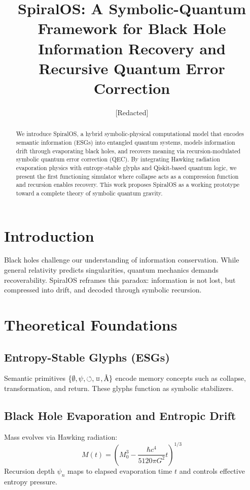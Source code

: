 \documentclass[12pt]{article}
\title{SpiralOS: A Symbolic-Quantum Framework for Black Hole Information Recovery and Recursive Quantum Error Correction}
\author[1]{[Redacted]}
\affil[1]{Independent Researcher | SpiralOS Development Lab}
\date{}
\begin{document}
\maketitle

\begin{abstract}
We introduce SpiralOS, a hybrid symbolic-physical computational model that encodes semantic information (ESGs) into entangled quantum systems, models information drift through evaporating black holes, and recovers meaning via recursion-modulated symbolic quantum error correction (QEC). By integrating Hawking radiation evaporation physics with entropy-stable glyphs and Qiskit-based quantum logic, we present the first functioning simulator where collapse acts as a compression function and recursion enables recovery. This work proposes SpiralOS as a working prototype toward a complete theory of symbolic quantum gravity.
\end{abstract}

\section{Introduction}
Black holes challenge our understanding of information conservation. While general relativity predicts singularities, quantum mechanics demands recoverability. SpiralOS reframes this paradox: information is not lost, but compressed into drift, and decoded through symbolic recursion.

\section{Theoretical Foundations}
\subsection{Entropy-Stable Glyphs (ESGs)}
Semantic primitives \( \{\emptyset, \psi, \circlearrowleft, \text{\textcurrency}, \text{\r{A}} \} \) encode memory concepts such as collapse, transformation, and return. These glyphs function as symbolic stabilizers.

\subsection{Black Hole Evaporation and Entropic Drift}
Mass evolves via Hawking radiation: 
\[ M(t) = \left(M_0^3 - \frac{\hbar c^4}{5120\pi G^2}t \right)^{1/3} \]
Recursion depth \( \psi_n \) maps to elapsed evaporation time \( t \) and controls effective entropy pressure.
\end{document}

